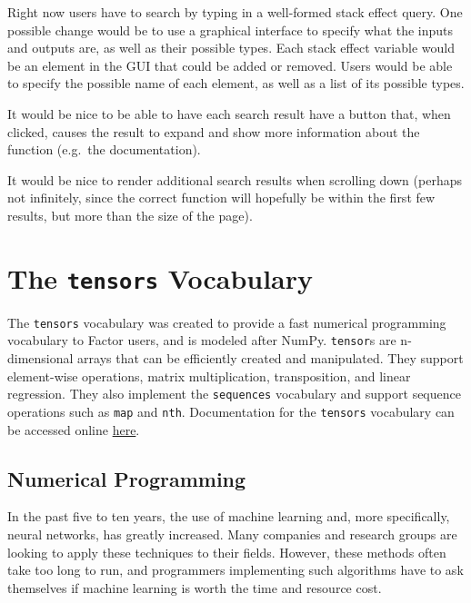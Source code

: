 \documentclass[
]{article}
\begin{document}
Right now users have to search by typing in a well-formed stack effect
query. One possible change would be to use a graphical interface to
specify what the inputs and outputs are, as well as their possible
types. Each stack effect variable would be an element in the GUI that
could be added or removed. Users would be able to specify the possible
name of each element, as well as a list of its possible types.

It would be nice to be able to have each search result have a button
that, when clicked, causes the result to expand and show more
information about the function (e.g.~the documentation).

It would be nice to render additional search results when scrolling down
(perhaps not infinitely, since the correct function will hopefully be
within the first few results, but more than the size of the page).

\hypertarget{the-tensors-vocabulary}{%
\section{\texorpdfstring{The \texttt{tensors}
Vocabulary}{The tensors Vocabulary}}\label{the-tensors-vocabulary}}

The \texttt{tensors} vocabulary was created to provide a fast numerical
programming vocabulary to Factor users, and is modeled after NumPy.
\texttt{tensor}s are n-dimensional arrays that can be efficiently
created and manipulated. They support element-wise operations, matrix
multiplication, transposition, and linear regression. They also
implement the \texttt{sequences} vocabulary and support sequence
operations such as \texttt{map} and \texttt{nth}. Documentation for the
\texttt{tensors} vocabulary can be accessed online
\href{https://docs.factorcode.org/content/article-tensors.html}{here}.

\hypertarget{numerical-programming}{%
\subsection{Numerical Programming}\label{numerical-programming}}

In the past five to ten years, the use of machine learning and, more
specifically, neural networks, has greatly increased. Many companies and
research groups are looking to apply these techniques to their fields.
However, these methods often take too long to run, and programmers
implementing such algorithms have to ask themselves if machine learning
is worth the time and resource cost.
\end{document}
